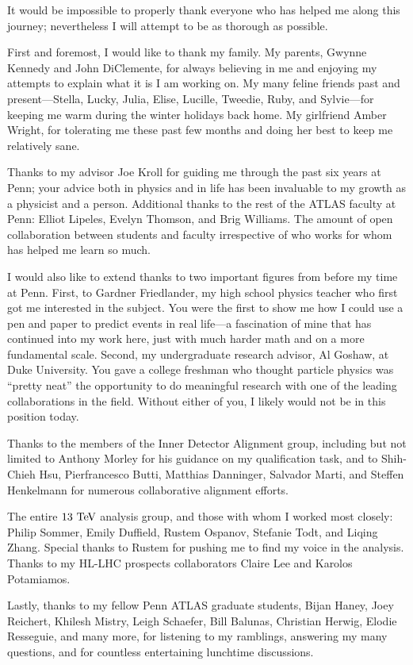 It would be impossible to properly thank everyone who has helped me along this journey; nevertheless I will attempt to be as thorough as possible.

First and foremost, I would like to thank my family.
My parents, Gwynne Kennedy and John DiClemente, for always believing in me and enjoying my attempts to explain what it is I am working on.
My many feline friends past and present---Stella, Lucky, Julia, Elise, Lucille, Tweedie, Ruby, and Sylvie---for keeping me warm during the winter holidays back home.
My girlfriend Amber Wright, for tolerating me these past few months and doing her best to keep me relatively sane.

Thanks to my advisor Joe Kroll for guiding me through the past six years at Penn; your advice both in physics and in life has been invaluable to my growth as a physicist and a person.
Additional thanks to the rest of the ATLAS faculty at Penn: Elliot Lipeles, Evelyn Thomson, and Brig Williams.
The amount of open collaboration between students and faculty irrespective of who works for whom has helped me learn so much.

I would also like to extend thanks to two important figures from before my time at Penn.
First, to Gardner Friedlander, my high school physics teacher who first got me interested in the subject.
You were the first to show me how I could use a pen and paper to predict events in real life---a fascination of mine that has continued into my work here, just with much harder math and on a more fundamental scale.
Second, my undergraduate research advisor, Al Goshaw, at Duke University.
You gave a college freshman who thought particle physics was ``pretty neat'' the opportunity to do meaningful research with one of the leading collaborations in the field.
Without either of you, I likely would not be in this position today.

Thanks to the members of the Inner Detector Alignment group, including but not limited to Anthony Morley for his guidance on my qualification task, and to Shih-Chieh Hsu, Pierfrancesco Butti, Matthias Danninger, Salvador Marti, and Steffen Henkelmann for numerous collaborative alignment efforts.

The entire \ssww $13\tev$ analysis group, and those with whom I worked most closely: Philip Sommer, Emily Duffield, Rustem Ospanov, Stefanie Todt, and Liqing Zhang.
Special thanks to Rustem for pushing me to find my voice in the analysis.
Thanks to my \ssww HL-LHC prospects collaborators Claire Lee and Karolos Potamiamos.

Lastly, thanks to my fellow Penn ATLAS graduate students, Bijan Haney, Joey Reichert, Khilesh Mistry, Leigh Schaefer, Bill Balunas, Christian Herwig, Elodie Resseguie, and many more, for listening to my ramblings, answering my many questions, and for countless entertaining lunchtime discussions.
